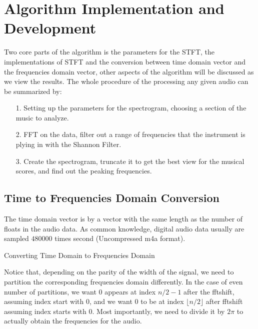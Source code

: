 \documentclass{article}
\begin{document}
\section{Algorithm Implementation and Development}
    \par\hspace{1.1em}
    Two core parts of the algorithm is the parameters for the STFT, the implementations of STFT and the conversion between time domain vector and the frequencies domain vector, other aspects of the algorithm will be discussed as we view the results. The whole procedure of the processing any given audio can be summarized by: 
    \begin{enumerate}
        \item[1.] Setting up the parameters for the spectrogram, choosing a section of the music to analyze.
        \item[2.] FFT on the data, filter out a range of frequencies that the instrument is plying in with the Shannon Filter. 
        \item[3.] Create the spectrogram, truncate it to get the best view for the musical scores, and find out the peaking frequencies. 
    \end{enumerate}
    \subsection{Time to Frequencies Domain Conversion}
        \par\hspace{1.1em}
        The time domain vector is by a vector with the same length as the number of floats in the audio data. As common knowledge, digital audio data usually are sampled $480000$ times second (Uncompressed m4a format). 
        \begin{algorithm}\label{alg:1}
            \begin{algorithmic}[1]
                \ELSE
                \ENDIF
            \end{algorithmic}\caption{Converting Time Domain to Frequencies Domain}
        \end{algorithm}
        \par
        Notice that, depending on the parity of the width of the signal, we need to partition the corresponding frequencies domain differently. In the case of even number of partitions, we want $0$ appears at index $n/2-1$ after the fftshift, assuming index start with $0$, and we want $0$ to be at index $\lfloor n/2\rfloor$ after fftshift assuming index starts with $0$. Most importantly, we need to divide it by $2\pi$ to actually obtain the frequencies for the audio.
        
\end{document}
